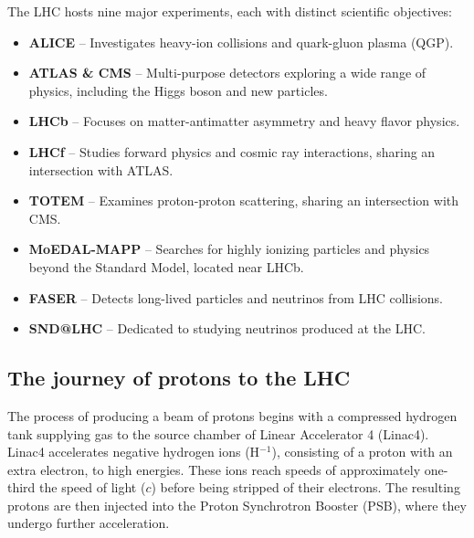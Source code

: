 The LHC hosts nine major experiments, each with distinct scientific objectives:
\begin{itemize}
\item {\bf ALICE} – Investigates heavy-ion collisions and quark-gluon plasma (QGP).
\item {\bf ATLAS \& CMS} – Multi-purpose detectors exploring a wide range of physics, including the Higgs boson and new particles.
\item {\bf LHCb} – Focuses on matter-antimatter asymmetry and heavy flavor physics.
\item {\bf LHCf} – Studies forward physics and cosmic ray interactions, sharing an intersection with ATLAS.
\item {\bf TOTEM} – Examines proton-proton scattering, sharing an intersection with CMS.
\item {\bf MoEDAL-MAPP} – Searches for highly ionizing particles and physics beyond the Standard Model, located near LHCb.
\item {\bf FASER} – Detects long-lived particles and neutrinos from LHC collisions.
\item {\bf SND@LHC} – Dedicated to studying neutrinos produced at the LHC.
\end{itemize}

\subsection{The journey of protons to the LHC}
The process of producing a beam of protons begins with a compressed hydrogen tank supplying gas to the source chamber of Linear Accelerator 4 (Linac4). Linac4 accelerates negative hydrogen ions (H$^{-1}$), consisting of a proton with an extra electron, to high energies.
These ions reach speeds of approximately one-third the speed of light ($c$) before being stripped of their electrons. The resulting protons are then injected into the Proton Synchrotron Booster (PSB), where they undergo further acceleration.

